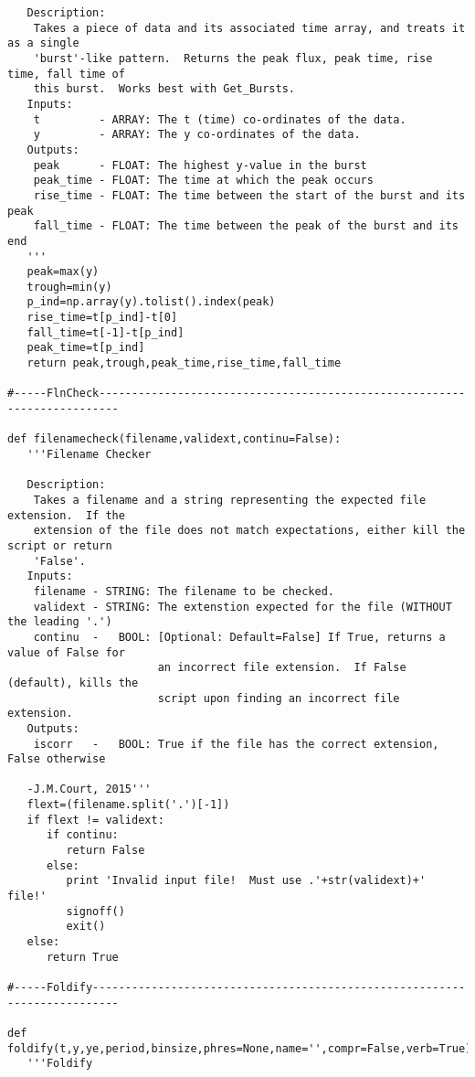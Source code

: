 \begin{verbatim}
   Description:
    Takes a piece of data and its associated time array, and treats it as a single
    'burst'-like pattern.  Returns the peak flux, peak time, rise time, fall time of
    this burst.  Works best with Get_Bursts.
   Inputs:
    t         - ARRAY: The t (time) co-ordinates of the data.
    y         - ARRAY: The y co-ordinates of the data.
   Outputs:
    peak      - FLOAT: The highest y-value in the burst
    peak_time - FLOAT: The time at which the peak occurs
    rise_time - FLOAT: The time between the start of the burst and its peak
    fall_time - FLOAT: The time between the peak of the burst and its end
   '''
   peak=max(y)
   trough=min(y)
   p_ind=np.array(y).tolist().index(peak)
   rise_time=t[p_ind]-t[0]
   fall_time=t[-1]-t[p_ind]
   peak_time=t[p_ind]
   return peak,trough,peak_time,rise_time,fall_time

#-----FlnCheck-------------------------------------------------------------------------

def filenamecheck(filename,validext,continu=False):
   '''Filename Checker
   
   Description:
    Takes a filename and a string representing the expected file extension.  If the
    extension of the file does not match expectations, either kill the script or return
    'False'.
   Inputs:
    filename - STRING: The filename to be checked.
    validext - STRING: The extenstion expected for the file (WITHOUT the leading '.')
    continu  -   BOOL: [Optional: Default=False] If True, returns a value of False for
                       an incorrect file extension.  If False (default), kills the
                       script upon finding an incorrect file extension.
   Outputs:
    iscorr   -   BOOL: True if the file has the correct extension, False otherwise

   -J.M.Court, 2015'''
   flext=(filename.split('.')[-1])
   if flext != validext:
      if continu:
         return False
      else:
         print 'Invalid input file!  Must use .'+str(validext)+' file!'
         signoff()
         exit()
   else:
      return True

#-----Foldify--------------------------------------------------------------------------

def foldify(t,y,ye,period,binsize,phres=None,name='',compr=False,verb=True):
   '''Foldify


\end{verbatim}
